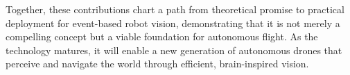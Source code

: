 Together, these contributions chart a path from theoretical promise to practical deployment for event-based robot vision, demonstrating that it is not merely a compelling concept but a viable foundation for autonomous flight. As the technology matures, it will enable a new generation of autonomous drones that perceive and navigate the world through efficient, brain-inspired vision.
